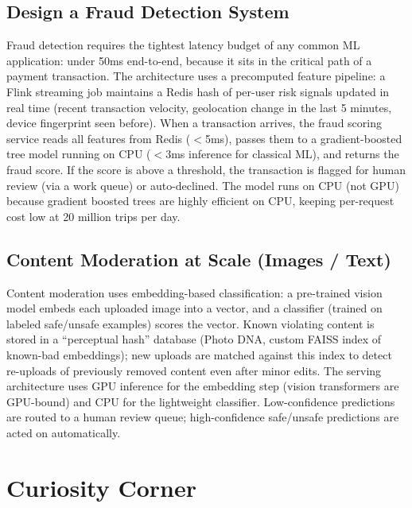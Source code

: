 \documentclass[11pt,a4paper]{article}
\begin{document}
\subsection{Design a Fraud Detection System}

Fraud detection requires the tightest latency budget of any common ML application: under 50ms end-to-end, because it sits in the critical path of a payment transaction. The architecture uses a precomputed feature pipeline: a Flink streaming job maintains a Redis hash of per-user risk signals updated in real time (recent transaction velocity, geolocation change in the last 5 minutes, device fingerprint seen before). When a transaction arrives, the fraud scoring service reads all features from Redis ($<$5ms), passes them to a gradient-boosted tree model running on CPU ($<$3ms inference for classical ML), and returns the fraud score. If the score is above a threshold, the transaction is flagged for human review (via a work queue) or auto-declined. The model runs on CPU (not GPU) because gradient boosted trees are highly efficient on CPU, keeping per-request cost low at 20 million trips per day.

\subsection{Content Moderation at Scale (Images / Text)}

Content moderation uses embedding-based classification: a pre-trained vision model embeds each uploaded image into a vector, and a classifier (trained on labeled safe/unsafe examples) scores the vector. Known violating content is stored in a ``perceptual hash'' database (Photo DNA, custom FAISS index of known-bad embeddings); new uploads are matched against this index to detect re-uploads of previously removed content even after minor edits. The serving architecture uses GPU inference for the embedding step (vision transformers are GPU-bound) and CPU for the lightweight classifier. Low-confidence predictions are routed to a human review queue; high-confidence safe/unsafe predictions are acted on automatically.

\section{Curiosity Corner}
\end{document}
